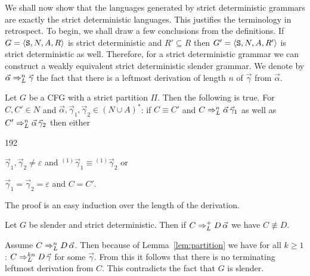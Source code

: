 We shall now show that the languages generated by strict
deterministic grammars are exactly the strict deterministic
languages. This justifies the terminology in retrospect.
To begin, we shall draw a few conclusions from the definitions.
If $G = \langle \mbox{\tt S}, N, A, R\rangle$ is strict deterministic
and $R' \subseteq R$ then $G' = \langle \mbox{\tt S}, N, A, R'\rangle$
is strict deterministic as well. Therefore, for a strict
deterministic grammar we can construct a weakly equivalent
strict deterministic slender grammar. We denote by
$\vec{\alpha} \Rightarrow^n_L \vec{\gamma}$
the fact that there is a leftmost derivation of length $n$ of
$\vec{\gamma}$ from $\vec{\alpha}$.
\begin{lem}
\label{lem:partition}
Let $G$ be a CFG with a strict partition $\Pi$.
Then the following is true.
    For $C, C' \in N$ and $\vec{\alpha}, \vec{\gamma}_1,
    \vec{\gamma}_2 \in (N \cup A)^{\ast}$: if $C \equiv C'$
    and $C \Rightarrow^n_L \vec{\alpha}\, \vec{\gamma}_1$ as well as
    $C' \Rightarrow^n_L \vec{\alpha}\, \vec{\gamma}_2$ then either
        \begin{dingautolist}{192}
        \item
            $\vec{\gamma}_1, \vec{\gamma}_2 \neq \varepsilon$ and
            ${^{(1)}\vec{\gamma}_1} \equiv {^{(1)}\vec{\gamma}_2}$
            or
        \item
            $\vec{\gamma}_1 = \vec{\gamma}_2 = \varepsilon$ and
            $C = C'$.
        \end{dingautolist}
\end{lem}
The proof is an easy induction over the length of the derivation.
\begin{lem}
\label{lem:linksrekursiv}
Let $G$ be slender and strict deterministic. Then if
$C \Rightarrow_L^+ D\, \vec{\alpha}$ we have $C \not\equiv D$.
\end{lem}
\proofbeg
Assume $C \Rightarrow^n_L D\, \vec{\alpha}$. Then because of
Lemma~\ref{lem:partition} we have for all $k \geq 1$:
$C \Rightarrow^{kn}_L D\, \vec{\gamma}$ for some $\vec{\gamma}$.
From this it follows that there is no terminating leftmost
derivation from $C$. This contradicts the fact that $G$ is
slender.
\proofend

